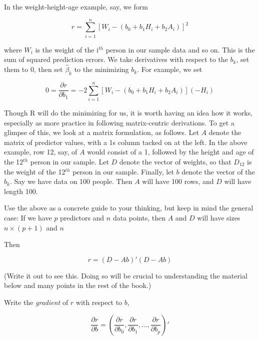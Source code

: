 In the weight-height-age example, say, we form 

\begin{equation}
\label{rss}
r =
\sum_{i=1}^n [W_i - (b_0 + b_1 H_i + b_2 A_i)]^2
\end{equation}

where $W_i$ is the weight of the i$^{th}$ person in our sample data and
so on. This is the sum of squared prediction errors.  We take
derivatives with respect to the $b_k$, set them to 0, then set
$\widehat{\beta}_k$ to the minimizing $b_k$.  For example, we set

\begin{equation}
0 = \frac{\partial{r}}{\partial{b_1}} =
-2 \sum_{i=1}^n [W_i - (b_0 + b_1 H_i + b_2 A_i)] (-H_i)
\end{equation}

Though R will do the minimizing for us, it is worth having an idea how
it works, especially as more practice in following matrix-centric
derivations.  To get a glimpse of this, we look at a matrix formulation, as
follows.  Let $A$ denote the matrix of predictor values, with a 1s
column tacked on at the left.  In the above example, row 12, say, of $A$
would consist of a 1, followed by the height and age of the 12$^{th}$
person in our sample.  Let $D$ denote the vector of weights, so that
$D_{12}$ is the weight of the 12$^{th}$ person in our sample.  Finally,
let $b$ denote the vector of the $b_k$.  Say we have data on 100 people.
Then $A$ will have 100 rows, and $D$ will have length 100.

Use the above as a concrete guide to your thinking, but keep in mind the
general case:  If we have $p$ predictors and $n$ data points, then $A$
and $D$ will have sizes $n \times (p+1)$ and $n$

Then

\begin{equation}
\label{dab}
r = (D - A b)' (D - Ab)
\end{equation}

(Write it out to see this.  Doing so will be crucial to understanding
the material below and many points in the rest of the book.)

Write the \textit{gradient} of $r$ with respect to $b$,

\begin{equation}
\frac{\partial r}{\partial b} = (
\frac{\partial r}{\partial b_0},
\frac{\partial r}{\partial b_1},
...,
\frac{\partial r}{\partial b_p}
)'
\end{equation}

